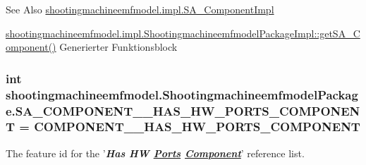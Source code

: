 \begin{DoxySeeAlso}{See Also}
\hyperlink{classshootingmachineemfmodel_1_1impl_1_1_s_a___component_impl}{shootingmachineemfmodel.\-impl.\-S\-A\-\_\-\-Component\-Impl} 

\hyperlink{classshootingmachineemfmodel_1_1impl_1_1_shootingmachineemfmodel_package_impl_a8ca2d4f6946a882d7676eef21e132f62}{shootingmachineemfmodel.\-impl.\-Shootingmachineemfmodel\-Package\-Impl\-::get\-S\-A\-\_\-\-Component()} Generierter Funktionsblock 
\end{DoxySeeAlso}
\hypertarget{interfaceshootingmachineemfmodel_1_1_shootingmachineemfmodel_package_afa727a1f9f9db4ffc8ab990f94d695da}{
\subsubsection[{S\-A\-\_\-\-C\-O\-M\-P\-O\-N\-E\-N\-T\-\_\-\-\_\-\-H\-A\-S\-\_\-\-H\-W\-\_\-\-P\-O\-R\-T\-S\-\_\-\-C\-O\-M\-P\-O\-N\-E\-N\-T}]{\setlength{\rightskip}{0pt plus 5cm}int shootingmachineemfmodel.\-Shootingmachineemfmodel\-Package.\-S\-A\-\_\-\-C\-O\-M\-P\-O\-N\-E\-N\-T\-\_\-\-\_\-\-H\-A\-S\-\_\-\-H\-W\-\_\-\-P\-O\-R\-T\-S\-\_\-\-C\-O\-M\-P\-O\-N\-E\-N\-T = {\bf C\-O\-M\-P\-O\-N\-E\-N\-T\-\_\-\-\_\-\-H\-A\-S\-\_\-\-H\-W\-\_\-\-P\-O\-R\-T\-S\-\_\-\-C\-O\-M\-P\-O\-N\-E\-N\-T}}}\label{interfaceshootingmachineemfmodel_1_1_shootingmachineemfmodel_package_afa727a1f9f9db4ffc8ab990f94d695da}
The feature id for the '{\itshape {\bfseries Has H\-W \hyperlink{interfaceshootingmachineemfmodel_1_1_ports}{Ports} \hyperlink{interfaceshootingmachineemfmodel_1_1_component}{Component}}}' reference list.

